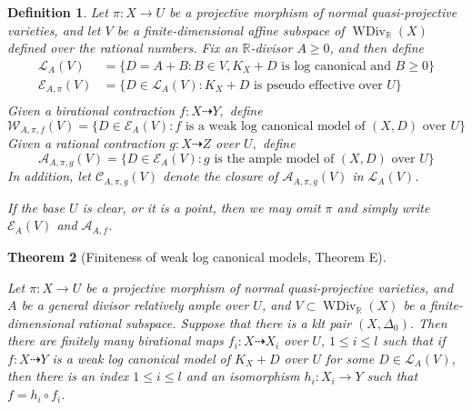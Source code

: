 \documentclass[11pt]{amsart}
\newtheorem{defn}{Definition}[section]
\newtheorem{thm}[defn]{Theorem}
\begin{document}
\begin{defn}\label{polytopeofdivisor}
  \cite[Definition 1.1.4]{BCHM10} Let $ \pi: X\to U $ be a projective morphism of normal quasi-projective varieties, and let $ V $ be a finite-dimensional affine subspace of $ \operatorname{WDiv}_{\mathbb{R}}(X) $ defined over the rational numbers. Fix an $ \mathbb{R} $-divisor $ A\geqslant 0 $, and then define
  \[
    \begin{aligned}
      \mathcal{L}_A(V)       & =\{D=A+B:B \in V,  K_X+D \text{ is log canonical and  } B\geqslant0 \} \\
      \mathcal{E}_{A,\pi}(V) & =\{D\in \mathcal{L}_A(V): K_X+D \text{ is pseudo effective over } U\}  \\
    \end{aligned}
  \]
  Given a birational contraction $ f:X \dashrightarrow Y,$ define
  \[ \mathcal{W}_{A,\pi,f}(V)=\{D\in \mathcal{E}_{A}(V): f \text{ is a weak log canonical model of  } (X,D) \text{ over }U\} \]
  Given a rational contraction $g:X\dashrightarrow Z  $ over $ U, $ define
  \[ \mathcal{A}_{A,\pi,g}(V)=\{D\in \mathcal{E}_{A}(V): g \text{ is the ample model of  } (X,D) \text{ over }U\} \]
  In addition, let $ \mathcal{C}_{A,\pi,g}(V) $ denote the closure of $ \mathcal{A}_{A,\pi,g}(V) $ in $\mathcal{L}_{A}(V)$.

  If the base $U$ is clear, or it is a point, then we may omit $\pi$ and simply write $\mathcal{E}_{A}(V)$ and $\mathcal{A}_{A,f}$.
\end{defn}

\begin{thm}[Finiteness of weak log canonical models, \cite{BCHM10} Theorem E]\label{finitewlcm}

  Let $\pi: X\to U$ be a projective morphism of normal quasi-projective varieties, and $A$ be a general divisor relatively ample over $U$, and $V \subset \operatorname{WDiv}_{\mathbb{R}}(X)$ be a finite-dimensional rational subspace. Suppose that there is a klt pair $(X,\Delta_{0})$. Then there are finitely many birational maps $f_{i}:X \dashrightarrow X_{i}$ over $U$, $1\leqslant i\leqslant l$ such that if $f:X \dashrightarrow  Y$ is a weak log canonical model of $K_{X}+D$ over $U$ for some $D \in \mathcal{L}_{A}(V)$, then there is an index $1\leqslant i\leqslant l$ and an  isomorphism  $h_{i}:X_{i} \to Y$  such that $f=h_{i}\circ f_{i}$.

\end{thm}
\end{document}
